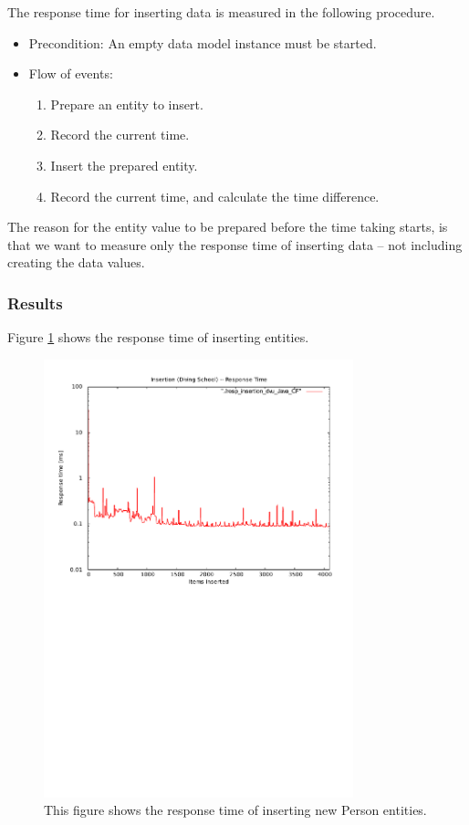 The response time for inserting data is measured in the following
procedure.
\begin{itemize}
\item Precondition: An empty data model instance must be started.
\item Flow of events:

\begin{enumerate}
\item Prepare an entity to insert.
\item Record the current time.
\item Insert the prepared entity.
\item Record the current time, and calculate the time difference.
\end{enumerate}
\end{itemize}
The reason for the entity value to be prepared before the time taking
starts, is that we want to measure only the response time of inserting
data -- not including creating the data values.


\subsubsection{Results}

Figure \ref{fig:insertionDvuResponse} shows the response time of
inserting entities. 

\begin{figure}[h!]
\centering
\includegraphics[width = 0.8\textwidth, trim = 0 15cm 0 1cm] {img/insertionDvuResponse.pdf}
\caption{This figure shows the response time of inserting new Person entities.}
\label{fig:insertionDvuResponse}
\end{figure}


